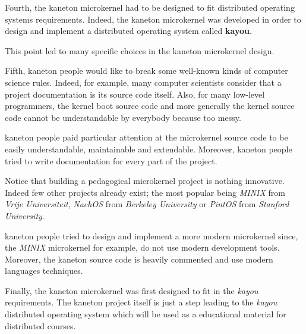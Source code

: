 Fourth, the kaneton microkernel had to be designed to fit distributed
operating systems requirements. Indeed, the kaneton microkernel was
developed in order to design and implement a distributed operating
system called \textbf{kayou}.

This point led to many specific choices in the kaneton microkernel design.

Fifth, kaneton people would like to break some well-known kinds of
computer science rules. Indeed, for example, many computer scientists
consider that a project documentation is its source code itself.
Also, for many low-level programmers, the kernel boot source code and
more generally the kernel source code cannot be understandable by everybody
because too messy.

kaneton people paid particular attention at the microkernel source code to be
easily understandable, maintainable and extendable. Moreover, kaneton
people tried to write documentation for every part of the project.

Notice that building a pedagogical microkernel project is nothing innovative.
Indeed few other projects already exist; the most popular being \textit{MINIX}
from \textit{Vrije Universiteit}, \textit{NachOS} from \textit{Berkeley
University} or \textit{PintOS} from \textit{Stanford University}.

kaneton people tried to design and implement a more modern microkernel
since, the \textit{MINIX} microkernel for example, do not use modern
development tools. Moreover, the kaneton source code is heavily commented
and use modern languages techniques.

Finally, the kaneton microkernel was first designed to fit in the
\textit{kayou} requirements. The kaneton project itself is just a step
leading to the \textit{kayou} distributed operating system which will
be used as a educational material for distributed courses.
